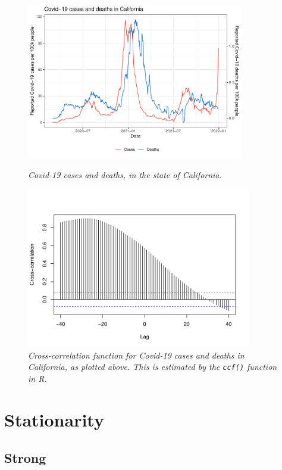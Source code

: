 \documentclass{article}
\begin{document}
\begin{figure}[p]
\centering
\includegraphics[width=0.85\textwidth]{fig/covid-1.pdf}
\caption{\it Covid-19 cases and deaths, in the state of California.}
\label{fig:covid-ts}

\includegraphics[width=0.875\textwidth]{fig/covid-2.pdf}
\cprotect\caption{\it Cross-correlation function for Covid-19 cases and deaths in
  California, as plotted above. This is estimated by the \verb|ccf()| function 
  in R.}   
\label{fig:covid-ccf}
\end{figure}

\section{Stationarity}
\def\eqd{\overset{d}{=}}

\subsection{Strong}
\end{document}
